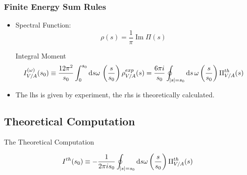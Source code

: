 \documentclass{beamer}
\DeclareMathOperator{\Ima}{Im}
\begin{document}
\begin{frame}
  \frametitle{Finite Energy Sum Rules}
  \begin{itemize}
  \item Spectral Function:
    \begin{equation}
      \rho(s) = \frac{1}{\pi} \Ima \Pi(s)
    \end{equation}
    \begin{block}{Integral Moment}
      \begin{equation}
        I_{V/A}^{(\omega)}(s_0) \equiv \frac{12 \pi^2}{s_0} \int_0^{s_0} \dif s \omega\, \left(\frac{s}{s_0}\right) \rho^{exp}_{V/A}(s)
        = \frac{6 \pi i}{s_0} \oint_{\abs{s}=s_0} \dif s\, \omega\left(\frac{s}{s_0}\right) \Pi^{th}_{V/A}(s)
      \end{equation}
    \end{block}
    \item The lhs is given by experiment, the rhs is theoretically calculated.
  \end{itemize}
\end{frame}

\subsection{Theoretical Computation}
\begin{frame}
  \centering \vspace{0.5cm}
  \begin{LARGE}
    The Theoretical Computation
  \end{LARGE}
  \begin{equation}
    I^{th}(s_0) \equiv - \frac{1}{2 \pi i s_0} \oint_{\abs{s}=s_0} \dif s \omega\left(\frac{s}{s_0}\right) \Pi_{V/A}^{th}(s)
  \end{equation}
\end{frame}
\end{document}
